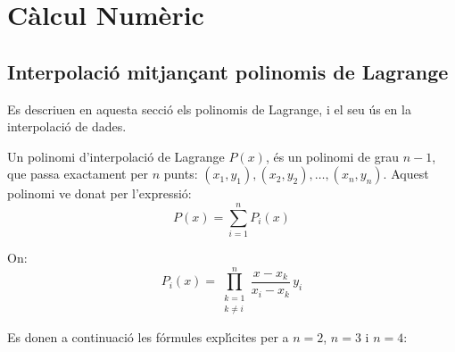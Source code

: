 \chapter{C\`{a}lcul Num\`{e}ric} 

\section{Interpolaci\'{o} mitjan\c{c}ant polinomis de Lagrange}

Es descriuen en aquesta secci\'{o} els polinomis de Lagrange, i el seu \'{u}s en la interpolaci\'{o} de dades.

Un polinomi d'interpolaci\'{o} de Lagrange $P(x)$, \'{e}s un polinomi de grau $n-1$, que passa exactament per $n$ punts:
$(x_1, y_1), (x_2, y_2), \dots, (x_n, y_n)$. Aquest polinomi ve donat per l'expressi\'{o}:
\begin{equation}
  P(x) = \sum_{i=1}^{n} P_i(x)
\end{equation}

On:
\begin{equation}
  P_i(x) = \prod_{\substack{k=1 \\ k\neq i}}^{n} \frac{x-x_k}{x_i-x_k}\, y_i
\end{equation}

Es donen a continuaci\'{o} les f\'{o}rmules expl\'{\i}cites per a $n = 2$, $n=3$ i $n=4$:


